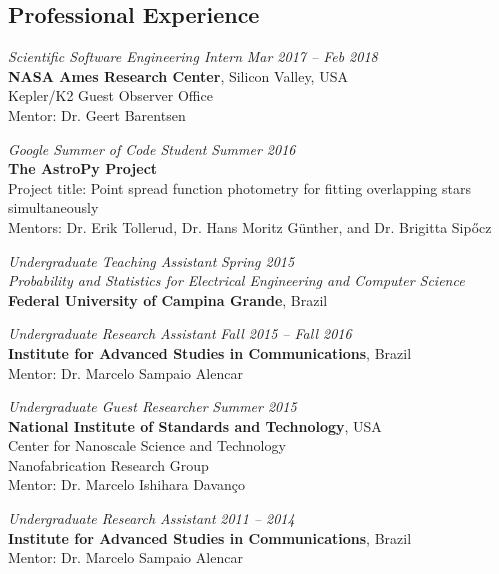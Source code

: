 \documentclass[10pt]{article}
\begin{document}
\begin{titlepage}
\section*{Professional Experience}

\emph{Scientific Software Engineering Intern} \hfill \textit{Mar 2017 -- Feb 2018}
\\\textbf{NASA Ames Research Center}, Silicon Valley, USA
\\Kepler/K2 Guest Observer Office
\\Mentor: Dr. Geert Barentsen
\vspace{.5cm}

\emph{Google Summer of Code Student} \hfill \textit{Summer 2016}
\\\textbf{The AstroPy Project}
\\ Project title: Point spread function photometry for fitting overlapping stars simultaneously
    \\Mentors: Dr. Erik Tollerud, Dr. Hans Moritz G\"unther, and Dr. Brigitta Sip\H{o}cz
\vspace{.5cm}

\emph{Undergraduate Teaching Assistant} \hfill \textit{Spring 2015}
\\\emph{Probability and Statistics for Electrical Engineering and Computer Science}
\\\textbf{Federal University of Campina Grande}, Brazil
\vspace{.5cm}

\emph{Undergraduate Research Assistant} \hfill \textit{Fall 2015 -- Fall 2016}
\\\textbf{Institute for Advanced Studies in Communications}, Brazil
\\Mentor: Dr. Marcelo Sampaio Alencar
\vspace{.5cm}

\emph{Undergraduate Guest Researcher} \hfill \textit{Summer 2015}
\\\textbf{National Institute of Standards and Technology}, USA
\\Center for Nanoscale Science and Technology
\\Nanofabrication Research Group
\\Mentor: Dr. Marcelo Ishihara Davan\c co
\vspace{.5cm}

\emph{Undergraduate Research Assistant} \hfill \textit{2011 -- 2014}
\\\textbf{Institute for Advanced Studies in Communications}, Brazil
\\Mentor: Dr. Marcelo Sampaio Alencar


\end{titlepage}
\end{document}
